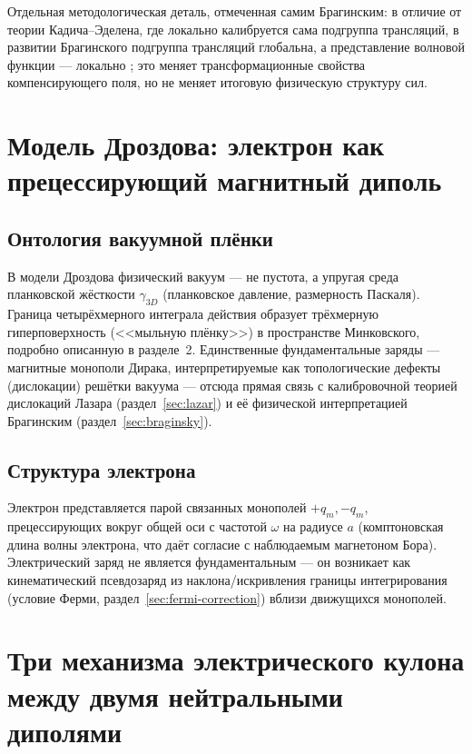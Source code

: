 \documentclass[12pt,a4paper]{article}
\begin{document}
Отдельная методологическая деталь, отмеченная самим Брагинским: в
отличие от теории Кадича--Эделена, где локально калибруется сама
подгруппа трансляций, в развитии Брагинского подгруппа трансляций
глобальна, а представление волновой функции --- локально
\cite{Braginsky2016}; это меняет трансформационные свойства
компенсирующего поля, но не меняет итоговую физическую структуру сил.

\section{Модель Дроздова: электрон как прецессирующий магнитный диполь}
\label{sec:model}

\subsection{Онтология вакуумной плёнки}

В модели Дроздова физический вакуум --- не пустота, а упругая среда
планковской жёсткости $\gamma_{3D}$ (планковское давление, размерность
Паскаля). Граница четырёхмерного интеграла действия образует
трёхмерную гиперповерхность (<<мыльную плёнку>>) в пространстве
Минковского, подробно описанную в разделе~2. Единственные
фундаментальные заряды --- магнитные монополи Дирака, интерпретируемые
как топологические дефекты (дислокации) решётки вакуума --- отсюда
прямая связь с калибровочной теорией дислокаций Лазара
(раздел~\ref{sec:lazar}) и её физической интерпретацией Брагинским
(раздел~\ref{sec:braginsky}).

\subsection{Структура электрона}

Электрон представляется парой связанных монополей $+q_m,-q_m$,
прецессирующих вокруг общей оси с частотой $\omega$ на радиусе $a$
(комптоновская длина волны электрона, что даёт согласие с наблюдаемым
магнетоном Бора). Электрический заряд не является фундаментальным ---
он возникает как кинематический псевдозаряд из наклона/искривления
границы интегрирования (условие Ферми, раздел~\ref{sec:fermi-correction})
вблизи движущихся монополей.

\section{Три механизма электрического кулона между двумя нейтральными диполями}
\label{sec:variants}
\end{document}
